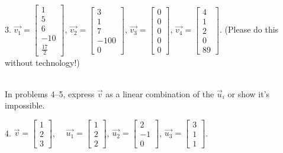 \documentclass{article}
\begin{document}
3. $\vec{v_1} = \left[\begin{array}{c} 1 \\ 5 \\ 6 \\ -10 \\ \frac{17}{2} \end{array}\right]$, $\vec{v_2} = \left[\begin{array}{c} 3 \\ 1 \\ 7 \\ -100 \\ 0\end{array}\right]$, $\vec{v_3} = \left[\begin{array}{c} 0 \\ 0 \\ 0 \\ 0 \\ 0 \end{array}\right]$, $\vec{v_4} = \left[\begin{array}{c} 4 \\ 1 \\ 2 \\ 0 \\ 89 \end{array}\right]$. (Please do this without technology!)

~\\

In problems 4--5, express $\vec{v}$ as a linear combination of the $\vec{u}_i$ or show it's impossible.

4. $\vec{v} = \left[\begin{array}{c} 1 \\ 2 \\ 3 \end{array}\right]$, $\quad \vec{u_1} = \left[\begin{array}{c} 1 \\ 2 \\ 2 \end{array}\right]$, $\vec{u_2} = \left[\begin{array}{c} 2 \\ -1 \\ 0 \end{array}\right]$, $\vec{u_3} = \left[\begin{array}{c} 3 \\ 1 \\ 1 \end{array}\right]$.
\end{document}
